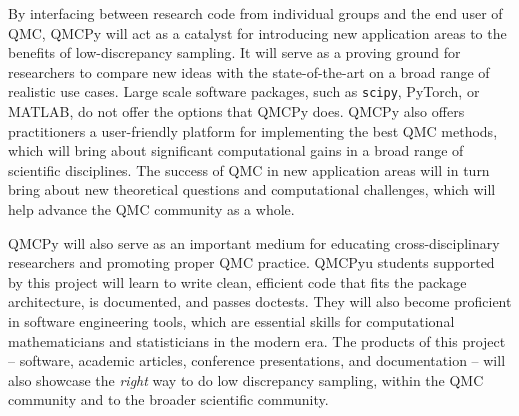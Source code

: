 \documentclass[11pt]{article}%
\begin{document}

By interfacing between research code from individual groups and the end user of QMC, QMCPy will act as a catalyst for introducing new application areas to the benefits of low-discrepancy sampling. It will serve as a proving ground for researchers to compare new ideas with the state-of-the-art on a broad range of realistic use cases. Large scale software packages, such as \texttt{scipy}, PyTorch, or MATLAB, do not offer the options that QMCPy does. QMCPy also offers practitioners a user-friendly platform for implementing the best QMC methods, which will bring about significant computational gains in a broad range of scientific disciplines. The success of QMC in new application areas will in turn bring about new theoretical questions and computational challenges, which will help advance the QMC community as a whole.

QMCPy will also serve as an important medium for educating cross-disciplinary researchers and promoting proper QMC practice. QMCPyu students supported by this project will learn to write clean, efficient code that fits the package architecture, is documented, and passes doctests. They will also become proficient in software engineering tools, which are essential skills for computational mathematicians and statisticians in the modern era. The products of this project -- software, academic articles, conference presentations, and documentation -- will also showcase the \textit{right} way to do low discrepancy sampling, within the QMC community and to the broader scientific community.


 
%
\end{document}
